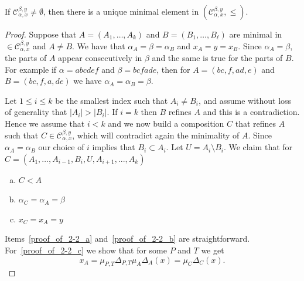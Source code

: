 \begin{lemma}\label{le:min}
If $\mathcal{C}_{\alpha,x}^{\beta,y}\ne\emptyset$, then there is a unique minimal element in $(\mathcal{C}_{\alpha,x}^{\beta,y},\le)$.
\end{lemma}
\begin{proof} Suppose that $A=(A_1,\ldots,A_k)$ and $B=(B_1,\ldots,B_\ell)$ are minimal in $\in \mathcal{C}_{\alpha,x}^{\beta,y}$ and $A\neq B$. We have that $\alpha_A=\beta=\alpha_B$ and $x_A=y=x_B$. Since $\alpha_A=\beta$, the parts of $A$ appear consecutively in $\beta$ and the same is true for the parts of $B$. For example if $\alpha=abcdef$ and $\beta=bcfade$, then for $A=(bc,f,ad,e)$ and $B=(bc,f,a,de)$ we have $\alpha_A=\alpha_B=\beta$.

 Let $1\le i\le k$ be the smallest index such that $A_i\ne B_i$, and assume without loss of generality that $|A_i|>|B_i|$. If $i=k$ then $B$ refines $A$ and this is a contradiction. Hence we assume that $i<k$ and we now build a composition $C$ that refines $A$ such that $C\in \mathcal{C}_{\alpha,x}^{\beta,y}$, which will contradict again the minimality of $A$. Since $\alpha_A=\alpha_B$ our choice of $i$ implies that $B_i\subset A_i$.
Let $U=A_i\setminus B_i$. We claim that for $C=(A_1,\ldots,A_{i-1},B_i,U,A_{i+1},...,A_k)$
\begin{enumerate}[(a)]
\item %
\label{proof_of_2-2_a} $C<A$ 
\item %
\label{proof_of_2-2_b} $\alpha_C=\alpha_A=\beta$
\item %
\label{proof_of_2-2_c} $x_C=x_A=y$
\end{enumerate}
Items~\ref{proof_of_2-2_a} and~\ref{proof_of_2-2_b} are straightforward. For~\ref{proof_of_2-2_c} we show that for some $P$ and $T$ we get
\begin{equation}\label{eq:xCisxA}
x_A=\mu_{P,T}\Delta_{P,T}\mu_A\Delta_A(x)=\mu_C\Delta_C(x).
\end{equation}


\end{proof}
